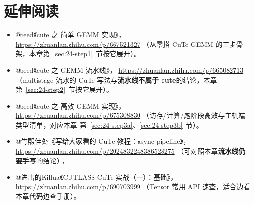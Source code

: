 \section*{延伸阅读}

\begin{itemize}
  \item @reed《cute 之 简单 GEMM 实现》，
        \url{https://zhuanlan.zhihu.com/p/667521327}
        （从零搭 CuTe GEMM 的三步骨架，本章第~\ref{sec:24-step1}~节按它展开）。
  \item @reed《cute 之 GEMM 流水线》，
        \url{https://zhuanlan.zhihu.com/p/665082713}
        （multistage 流水的 CuTe 写法与\textbf{流水线不属于 cute}的结论，本章
        第~\ref{sec:24-step2}~节按它展开）。
  \item @reed《cute 之 高效 GEMM 实现》，
        \url{https://zhuanlan.zhihu.com/p/675308830}
        （访存/计算/尾阶段高效与主机端类型清单，对应本章
        第~\ref{sec:24-step3a}、\ref{sec:24-step3b}~节）。
  \item @竹熙佳处《写给大家看的 CuTe 教程：async pipeline》，
        \url{https://zhuanlan.zhihu.com/p/2024832248386528275}
        （可对照本章\textbf{流水线仍要手写}的结论）；
  \item @进击的Killua《CUTLASS CuTe 实战（一）：基础》，
        \url{https://zhuanlan.zhihu.com/p/690703999}
        （Tensor 常用 API 速查，适合边看本章代码边查手册）。
\end{itemize}
